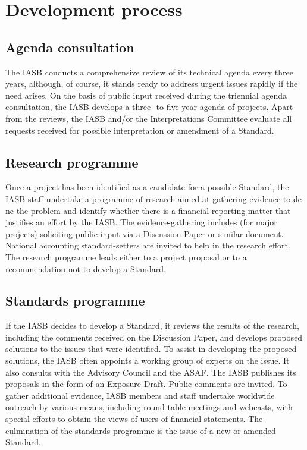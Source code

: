 \section{Development process}
\label{sec:DevelopmentProcess}

\subsection{Agenda consultation}
The IASB conducts a comprehensive review of its technical agenda every three years, although, of course, it stands ready to address urgent issues rapidly if the need arises. On the basis of public input received during the triennial agenda consultation, the IASB develops a three- to  five-year agenda of projects. Apart from the reviews, the IASB and/or the Interpretations Committee evaluate all requests received for possible interpretation or amendment of a Standard.

\subsection{Research programme}
Once a project has been identified as a candidate for a possible Standard, the IASB staff undertake a programme of research aimed at gathering evidence to de ne the problem and identify whether there is a  financial reporting matter that justifies an effort by the IASB.
The evidence-gathering includes (for major projects) soliciting public input via a Discussion Paper or similar document. National accounting standard-setters are invited to help in the research effort. The research programme leads either to a project proposal or to a recommendation not to develop a Standard.

\subsection{Standards programme}
If the IASB decides to develop a Standard, it reviews the results of the research, including the comments received on the Discussion Paper, and develops proposed solutions to the issues that were identified. To assist
in developing the proposed solutions, the IASB often appoints a working group of experts on the issue. It also consults with the Advisory Council and the ASAF. The IASB publishes its proposals in the form of an Exposure Draft. Public comments are invited. To gather additional evidence, IASB members and staff undertake worldwide outreach by various means, including round-table meetings and webcasts, with special efforts to obtain the views of users of  financial statements. The culmination of the standards programme is the issue of a new or amended Standard.


